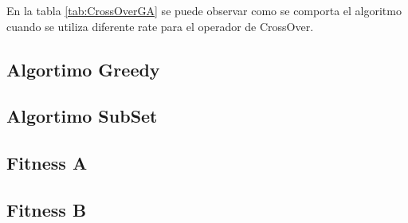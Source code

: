 En la tabla \ref{tab:CrossOverGA} se puede observar como se comporta el algoritmo cuando se utiliza diferente rate para el operador de CrossOver. 








\subsection{Algortimo Greedy}


\subsection{Algortimo SubSet}


\subsection{Fitness A}


\subsection{Fitness B}
